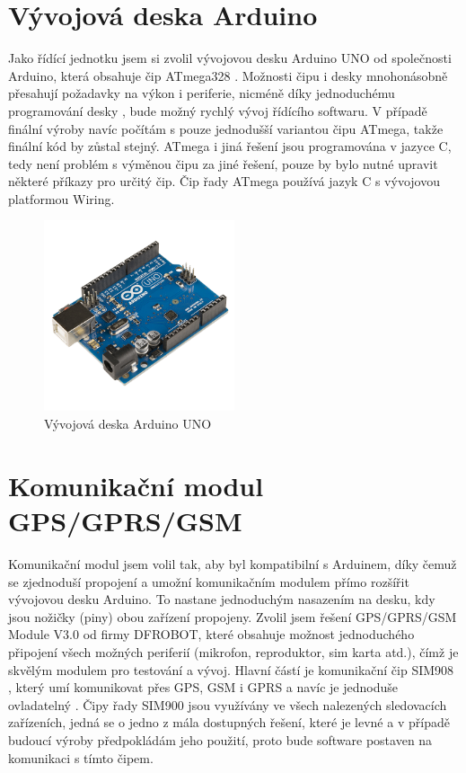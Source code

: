 \documentclass[FM,BP]{tulthesis}  %
\begin{document}
\section{Vývojová deska Arduino}
Jako řídící jednotku jsem si zvolil vývojovou desku Arduino UNO \cite{Arduino schematic} od společnosti Arduino, která obsahuje čip ATmega328 \cite{Atmega datasheet}. Možnosti čipu i desky mnohonásobně přesahují požadavky na výkon i periferie, nicméně díky jednoduchému programování desky \cite{Pruvodce arduinem}, bude možný rychlý vývoj řídícího softwaru. V případě finální výroby navíc počítám s pouze jednodušší variantou čipu ATmega, takže finální kód by zůstal stejný. ATmega i jiná řešení jsou programována v jazyce C, tedy není problém s výměnou čipu za jiné řešení, pouze by bylo nutné upravit některé příkazy pro určitý čip. Čip řady ATmega používá jazyk C s vývojovou platformou Wiring.

\begin{figure}[H]
\begin{center}
\includegraphics[width=0.5\textwidth]{images/arduino.png}
\caption{Vývojová deska Arduino UNO}
\label{image}
\end{center}
\end{figure}

\section{Komunikační modul GPS/GPRS/GSM}
Komunikační modul jsem volil tak, aby byl kompatibilní s Arduinem, díky čemuž se zjednoduší propojení a umožní komunikačním modulem přímo rozšířit vývojovou desku Arduino. To nastane jednoduchým nasazením na desku, kdy jsou nožičky (piny) obou zařízení propojeny. Zvolil jsem řešení GPS/GPRS/GSM Module V3.0 \cite{ROBOT schematic} od firmy DFROBOT, které obsahuje možnost jednoduchého připojení všech možných periferií (mikrofon, reproduktor, sim karta atd.), čímž je skvělým modulem pro testování a vývoj. Hlavní částí je komunikační čip SIM908 \cite{SIMCOM HW}, který umí komunikovat přes GPS, GSM i GPRS a navíc je jednoduše ovladatelný \cite{SIMCOM SW}. Čipy řady SIM900 jsou využívány ve všech nalezených sledovacích zařízeních, jedná se o jedno z mála dostupných řešení, které je levné a v případě budoucí výroby předpokládám jeho použití, proto bude software postaven na komunikaci s tímto čipem.
\end{document}
